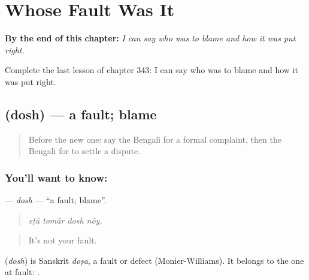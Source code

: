 
\chapter{Whose Fault Was It}
\label{ch:bn-whose-fault-was-it}

\begin{chapteropening}
\textbf{By the end of this chapter:} \emph{I can say who was to blame and how it was put right.}

Complete the last lesson of chapter 343: I can say who was to blame and how it was put right.
\end{chapteropening}

\section[\texorpdfstring{\bn{দোষ} (dosh)}{দোষ (dosh)}]{ (dosh) — a fault; blame}

\label{lesson:BN-C343-dosh}



\begin{quote}
Before the new one: say the Bengali for a formal complaint, then the Bengali for to settle a dispute.
\end{quote}

\subsection*{You'll want to know: }
\textbf{} — \emph{dosh} — \textquotedblleft{}a fault; blame\textquotedblright{}.

\begin{quote}
   
\end{quote}

\begin{quote}
\emph{eṭā tomār dosh nôy.}
\end{quote}

\begin{quote}
It's not your fault.
\end{quote}

\begin{cousinweb}
\textbf{} (\emph{dosh}) is Sanskrit \emph{doṣa}, a fault or defect (Monier-Williams). It belongs to the one at fault:  .
\end{cousinweb}


